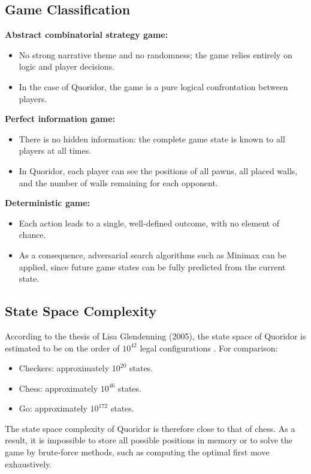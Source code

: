 \documentclass[a4paper]{article}
\begin{document}
\subsection{Game Classification}

\textbf{Abstract combinatorial strategy game:}
\begin{itemize}
  \item No strong narrative theme and no randomness; the game relies entirely
    on logic and player decisions.
  \item In the case of Quoridor, the game is a pure logical confrontation
    between players.
\end{itemize}

\textbf{Perfect information game:}
\begin{itemize}
  \item There is no hidden information: the complete game state is known to
    all players at all times.
  \item In Quoridor, each player can see the positions of all pawns, all
    placed walls, and the number of walls remaining for each opponent.
\end{itemize}

\textbf{Deterministic game:}
\begin{itemize}
  \item Each action leads to a single, well-defined outcome, with no element
    of chance.
  \item As a consequence, adversarial search algorithms such as Minimax can be
    applied, since future game states can be fully predicted from the current
    state.
\end{itemize}

\subsection{State Space Complexity}

According to the thesis of Lisa Glendenning (2005), the state space of
Quoridor is estimated to be on the order of $10^{42}$ legal configurations
\cite{Glendenning2005}.
For comparison:
\begin{itemize}
  \item Checkers: approximately $10^{20}$ states.
  \item Chess: approximately $10^{46}$ states.
  \item Go: approximately $10^{172}$ states.
\end{itemize}

The state space complexity of Quoridor is therefore close to that of chess. As
a result, it is impossible to store all possible positions in memory or to
solve the game by brute-force methods, such as computing the optimal first
move exhaustively.
\end{document}
